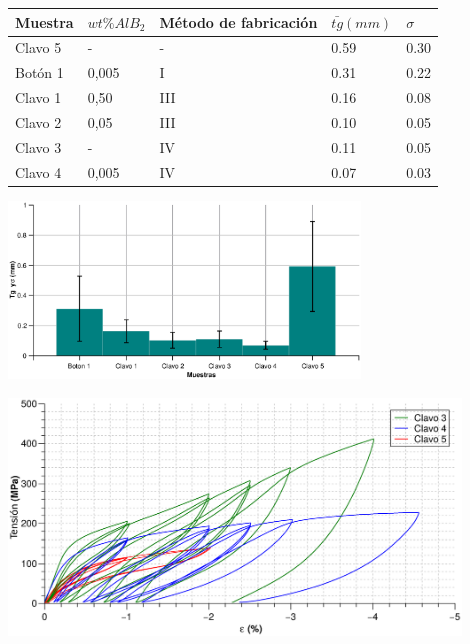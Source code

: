 \documentclass[usenames,dvipsnames]{beamer}
\begin{document}

\begin{frame}
 
 
 
\begin{table} 
\tiny
\begin{center} 
\begin{tabular}{@{}lllll@{}} \toprule
Muestra & $wt \% AlB_2$ & Método de fabricación & $\bar{tg} (mm)$ & $\sigma$ \\ \midrule
 Clavo 5 &  -     & -   & 0.59  & 0.30   \\
 Botón 1    &  0,005 & I   & 0.31 & 0.22  \\
 Clavo 1 &  0,50   & III & 0.16 & 0.08   \\
 Clavo 2 &  0,05  & III & 0.10 & 0.05   \\
 Clavo 3 &  -     & IV  & 0.11 & 0.05   \\
 Clavo 4 &  0,005 & IV  & 0.07 & 0.03   \\
\bottomrule
\end{tabular}
\end{center}
\end{table}
\begin{center}
\includegraphics[width=0.7\textwidth]{img/tamgrano/TamGranos.eps}
\end{center}

\end{frame}

\begin{frame}
 \begin{center}
\includegraphics[width=0.9\textwidth]{img/tamgrano/Clavos_3_4_5.eps}
\end{center}

\end{frame}
\end{document}
